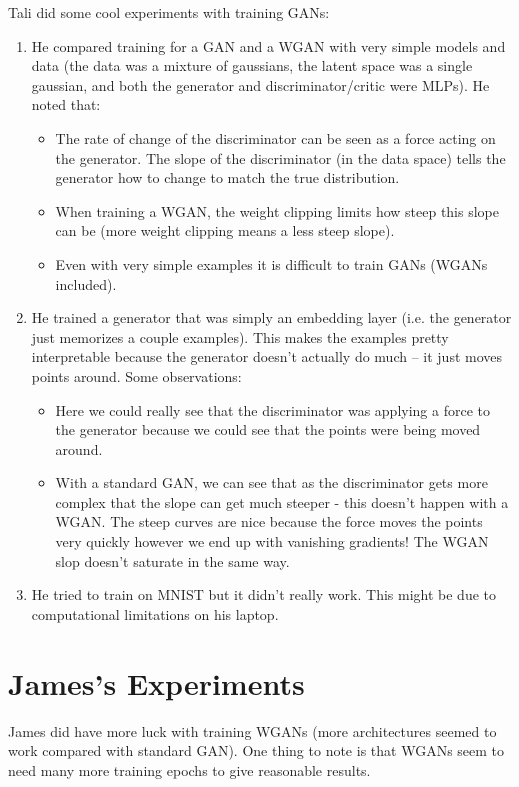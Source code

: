\documentclass{article}
\begin{document}
Tali did some cool experiments with training GANs:

\begin{enumerate}
	\item He compared training for a GAN and a WGAN with very simple models and data (the data was a mixture of gaussians, the latent space was a single gaussian, and both the generator and discriminator/critic were MLPs). He noted that:
	\begin{itemize}
		\item The rate of change of the discriminator can be seen as a force acting on the generator. The slope of the discriminator (in the data space) tells the generator how to change to match the true distribution.
		\item When training a WGAN, the weight clipping limits how steep this slope can be (more weight clipping means a less steep slope).
		\item Even with very simple examples it is difficult to train GANs (WGANs included).
	\end{itemize}
	\item He trained a generator that was simply an embedding layer (i.e. the generator just memorizes a couple examples). This makes the examples pretty interpretable because the generator doesn't actually do much -- it just moves points around. Some observations:
	\begin{itemize}
		\item Here we could really see that the discriminator was applying a force to the generator because we could see that the points were being moved around.
		\item With a standard GAN, we can see that as the discriminator gets more complex that the slope can get much steeper - this doesn't happen with a WGAN. The steep curves are nice because the force moves the points very quickly however we end up with vanishing gradients! The WGAN slop doesn't saturate in the same way.
	\end{itemize}
	\item He tried to train on MNIST but it didn't really work. This might be due to computational limitations on his laptop.
\end{enumerate}

\section{James's Experiments}

James did have more luck with training WGANs (more architectures seemed to work compared with standard GAN). One thing to note is that WGANs seem to need many more training epochs to give reasonable results.

\end{document}
